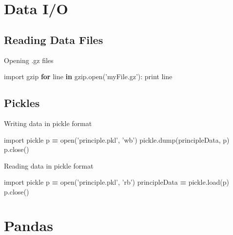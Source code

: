 \documentclass[]{book}
\newenvironment{Shaded}{\begin{snugshade}}{\end{snugshade}}
\newcommand{\KeywordTok}[1]{\textcolor[rgb]{0.13,0.29,0.53}{\textbf{#1}}}
\newcommand{\StringTok}[1]{\textcolor[rgb]{0.31,0.60,0.02}{#1}}
\newcommand{\ImportTok}[1]{#1}
\newcommand{\ControlFlowTok}[1]{\textcolor[rgb]{0.13,0.29,0.53}{\textbf{#1}}}
\newcommand{\OperatorTok}[1]{\textcolor[rgb]{0.81,0.36,0.00}{\textbf{#1}}}
\newcommand{\BuiltInTok}[1]{#1}
\newcommand{\NormalTok}[1]{#1}
\begin{document}
\chapter{Data I/O}\label{io}

\section{Reading Data Files}\label{reading-data-files}

Opening .gz files

\begin{Shaded}
\begin{Highlighting}[]
\ImportTok{import}\NormalTok{ gzip}
\ControlFlowTok{for}\NormalTok{ line }\KeywordTok{in}\NormalTok{ gzip.}\BuiltInTok{open}\NormalTok{(}\StringTok{'myFile.gz'}\NormalTok{):}
    \BuiltInTok{print}\NormalTok{ line}
\end{Highlighting}
\end{Shaded}

\section{Pickles}\label{pickles}

Writing data in pickle format

\begin{Shaded}
\begin{Highlighting}[]
\ImportTok{import}\NormalTok{ pickle}
\NormalTok{p }\OperatorTok{=} \BuiltInTok{open}\NormalTok{(}\StringTok{'principle.pkl'}\NormalTok{, }\StringTok{'wb'}\NormalTok{)}
\NormalTok{pickle.dump(principleData, p)}
\NormalTok{p.close()}
\end{Highlighting}
\end{Shaded}

Reading data in pickle format

\begin{Shaded}
\begin{Highlighting}[]
\ImportTok{import}\NormalTok{ pickle}
\NormalTok{p }\OperatorTok{=} \BuiltInTok{open}\NormalTok{(}\StringTok{'principle.pkl'}\NormalTok{, }\StringTok{'rb'}\NormalTok{)}
\NormalTok{principleData }\OperatorTok{=}\NormalTok{ pickle.load(p)}
\NormalTok{p.close()}
\end{Highlighting}
\end{Shaded}

\chapter{Pandas}\label{pandas}
\end{document}
